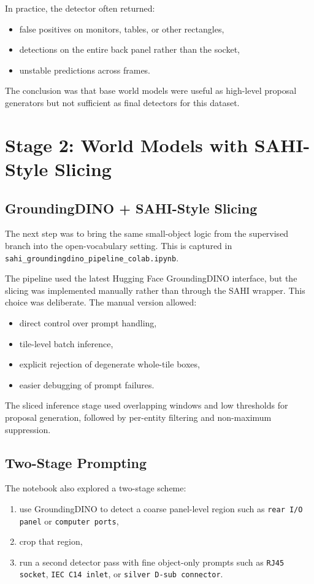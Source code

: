 \documentclass[11pt,a4paper]{article}
\begin{document}
In practice, the detector often returned:
\begin{itemize}[leftmargin=1.5em]
  \item false positives on monitors, tables, or other rectangles,
  \item detections on the entire back panel rather than the socket,
  \item unstable predictions across frames.
\end{itemize}

The conclusion was that base world models were useful as high-level proposal generators but not sufficient as final detectors for this dataset.

\section{Stage 2: World Models with SAHI-Style Slicing}

\subsection{GroundingDINO + SAHI-Style Slicing}

The next step was to bring the same small-object logic from the supervised branch into the open-vocabulary setting. This is captured in \texttt{sahi\_groundingdino\_pipeline\_colab.ipynb}.

The pipeline used the latest Hugging Face GroundingDINO interface, but the slicing was implemented manually rather than through the SAHI wrapper. This choice was deliberate. The manual version allowed:
\begin{itemize}[leftmargin=1.5em]
  \item direct control over prompt handling,
  \item tile-level batch inference,
  \item explicit rejection of degenerate whole-tile boxes,
  \item easier debugging of prompt failures.
\end{itemize}

The sliced inference stage used overlapping windows and low thresholds for proposal generation, followed by per-entity filtering and non-maximum suppression.

\subsection{Two-Stage Prompting}

The notebook also explored a two-stage scheme:
\begin{enumerate}[leftmargin=1.5em]
  \item use GroundingDINO to detect a coarse panel-level region such as \texttt{rear I/O panel} or \texttt{computer ports},
  \item crop that region,
  \item run a second detector pass with fine object-only prompts such as \texttt{RJ45 socket}, \texttt{IEC C14 inlet}, or \texttt{silver D-sub connector}.
\end{enumerate}
\end{document}
